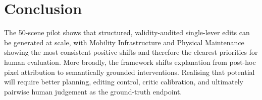 \section{Conclusion}

The 50-scene pilot shows that structured, validity-audited single-lever edits can be generated at scale, with Mobility Infrastructure and Physical Maintenance showing the most consistent positive shifts and therefore the clearest priorities for human evaluation. More broadly, the framework shifts explanation from post-hoc pixel attribution to semantically grounded interventions. Realising that potential will require better planning, editing control, critic calibration, and ultimately pairwise human judgement as the ground-truth endpoint.

